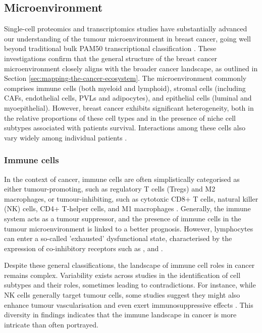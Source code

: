 \subsection{Microenvironment}

Single-cell proteomics and transcriptomics studies have substantially advanced our understanding of the tumour microenvironment in breast cancer, going well beyond traditional bulk PAM50 transcriptional classification \parencite{Wu2021-uq,Pal2021-rf,Wagner2019-zp}. These investigations confirm that the general structure of the breast cancer microenvironment closely aligns with the broader cancer landscape, as outlined in Section \cref{sec:mapping-the-cancer-ecosystem}. The microenvironment commonly comprises immune cells (both myeloid and lymphoid), stromal cells (including \acfp{CAF}, endothelial cells, \acfp{PVL} and adipocytes), and epithelial cells (luminal and myoepithelial). However, breast cancer exhibits significant heterogeneity, both in the relative proportions of these cell types and in the presence of niche cell subtypes associated with patients survival. Interactions among these cells also vary widely among individual patients \parencite{Danenberg2022-zb}.

\subsubsection*{Immune cells}

In the context of cancer, immune cells are often simplistically categorised as either tumour-promoting, such as regulatory T cells (Tregs) and M2 macrophages, or tumour-inhibiting, such as cytotoxic CD8+ T cells, natural killer (NK) cells, CD4+ T-helper cells, and M1 macrophages . Generally, the immune system acts as a tumour suppressor, and the presence of immune cells in the tumour microenvironment is linked to a better prognosis. However, lymphocytes can enter a so-called 'exhausted' dysfunctional state, characterised by the expression of co-inhibitory receptors such as ,  and .

Despite these general classifications, the landscape of immune cell roles in cancer remains complex. Variability exists across studies in the identification of cell subtypes and their roles, sometimes leading to contradictions. For instance, while NK cells generally target tumour cells, some studies suggest they might also enhance tumour vascularisation and even exert immunosuppressive effects \parencite{Retecki2021-se}. This diversity in findings indicates that the immune landscape in cancer is more intricate than often portrayed.

